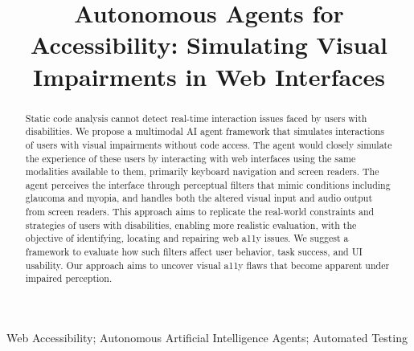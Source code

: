 \documentclass[10pt, conference]{IEEEtran}
\begin{document}
\title{Autonomous Agents for Accessibility: Simulating Visual Impairments in Web Interfaces}

\author{
}

\maketitle

\begin{abstract}
Static code analysis cannot detect real-time interaction issues faced by users with disabilities. We propose a multimodal \ac{AI} agent framework that simulates interactions of users with visual impairments without code access. 
The agent would closely simulate the experience of these users by interacting with web interfaces using the same modalities available to them, primarily keyboard navigation and screen readers. The agent perceives the interface through perceptual filters that mimic conditions including glaucoma and myopia, and handles both the altered visual input and audio output from screen readers. 
This approach aims to replicate the real-world constraints and strategies of users with disabilities, enabling more realistic evaluation, with the objective of identifying, locating and repairing web \ac{a11y} issues. 
We suggest a framework to evaluate how such filters affect user behavior, task success, and \ac{UI} usability. Our approach aims to uncover visual \ac{a11y} flaws that become apparent under impaired perception. 
\end{abstract}

\begin{IEEEkeywords}
Web Accessibility; Autonomous Artificial Intelligence Agents; Automated Testing
\end{IEEEkeywords}










\balance


\end{document}
